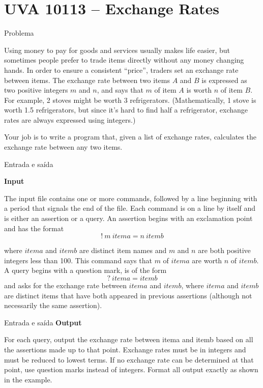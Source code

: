 \section{UVA 10113 -- Exchange Rates}

\begin{frame}[fragile]{Problema}

Using money to pay for goods and services usually makes life easier, but sometimes people prefer 
to trade items directly without any money changing hands. In order to ensure a consistent 
``price'', traders set an exchange rate between items. The exchange rate between two items $A$ and 
$B$ is expressed as two positive integers $m$ and $n$, and says that $m$ of item $A$ is worth 
$n$ of item $B$. For example, 2 stoves might be worth 3 refrigerators. (Mathematically, 1 stove 
is worth 1.5 refrigerators, but since it’s hard to find half a refrigerator, exchange rates are 
always expressed using integers.)

Your job is to write a program that, given a list of exchange rates, calculates the exchange rate
between any two items.

\end{frame}

\begin{frame}[fragile]{Entrada e saída}

\textbf{Input}

The input file contains one or more commands, followed by a line beginning with a period that 
signals the end of the file. Each command is on a line by itself and is either an assertion or a 
query. An assertion begins with an exclamation point and has the format
\[
!\ m\ itema = n\ itemb
\]

where $itema$ and $itemb$ are distinct item names and $m$ and $n$ are both positive integers less 
than 100.  This command says that $m$ of $itema$ are worth $n$ of $itemb$. A query begins with a 
question mark, is of the form
\[
?\ itema = itemb
\]
and asks for the exchange rate between $itema$ and $itemb$, where $itema$ and $itemb$ are distinct 
items that have both appeared in previous assertions (although not necessarily the same assertion).
\end{frame}

\begin{frame}[fragile]{Entrada e saída}
\textbf{Output}

For each query, output the exchange rate between itema and itemb based on all the assertions made 
up to that point. Exchange rates must be in integers and must be reduced to lowest terms. If no 
exchange rate can be determined at that point, use question marks instead of integers. Format all 
output exactly as shown in the example.
\end{frame}

